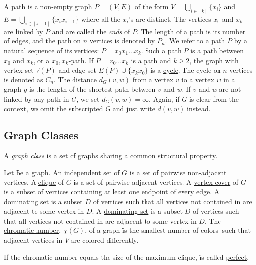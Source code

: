 \begin{definition}
    A path is a non-empty graph $P = (V,E)$ of the form $V = \bigcup_{i  \in [k]} \{x_i\}$ and $E = \bigcup_{i \in  [k-1]} \{x_ix_{i+1}\}$ where all the $x_i$'s are distinct. 
    The vertices $x_0$ and $x_k$ are \underline{linked} by $P$ and are called the \textit{ends} of $P$. The \underline{length} of a path is its number of edges, and the path on $n$ vertices is denoted by  $P_n$. 
    We refer to a path $P$ by a natural sequence of its vertices: $P = x_0x_1...x_k$. Such a path $P$ is a path between $x_0$ and $x_k$, or a $x_0,x_k$-path.
    If $P = x_0...x_k$ is a path and $k \geq 2$, the graph with vertex set $V(P)$ and edge set $E(P) \cup \{x_kx_0\}$ is a \underline{cycle}. The cycle on $n$ vertices is denoted as $C_n$.
    The \underline{distance} $d_G(v,w)$ from a vertex $v$ to a vertex $w$ in a graph $g$ is the length of the shortest path between $v$ and $w$. If $v$ and $w$ are not linked by any path in $G$, we set $d_G(v,w) = \infty$. Again, if $G$ is clear from the context, we omit the subscripted $G$ and just write $d(v,w)$ instead.
\end{definition}

\subsection{Graph Classes}

A \textit{graph class} is a set of graphs sharing a common structural property.

\begin{definition}
Let \G be a graph.
An  \underline{independent set} of $G$ is a set of pairwise non-adjacent vertices. 
A \underline{clique} of $G$ is a set of pairwise adjacent vertices. 
A \underline{vertex cover} of $G$ is a subset of vertices containing at least one endpoint of every edge. 
A \underline{dominating set} is a subset $D$ of vertices such that all vertices not contained in are adjacent to some vertex in $D$.
A \underline{dominating set} is a subset $D$ of vertices such that all vertices not contained in are adjacent to some vertex in $D$.
The \underline{chromatic number}, $\chi(G)$, of a graph \G is the smallest number of colors, such that adjacent vertices in $V$ are colored differently.

\end{definition}

\begin{graphclass}
If the chromatic number equals the size of the maximum clique, \G is called \underline{perfect}. 
\end{graphclass}

